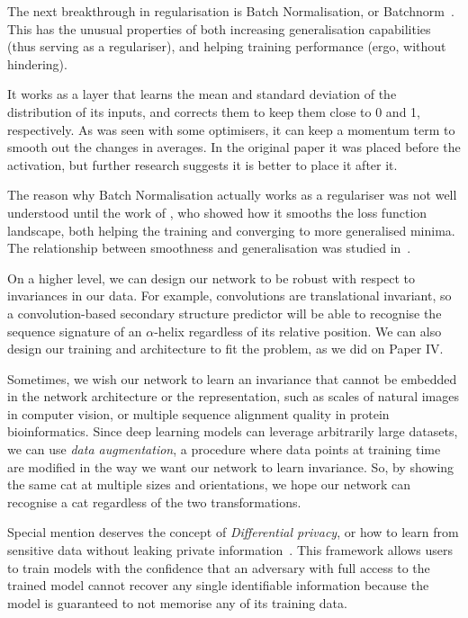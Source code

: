 The next breakthrough in regularisation is Batch Normalisation, 
or Batchnorm~\citep{bn}.
This has the unusual properties of both increasing generalisation capabilities (thus serving as a regulariser), and helping training performance (ergo, without hindering).

It works as a layer that learns the mean and standard deviation of the distribution of its inputs, and corrects them to keep them close to 0 and 1, respectively.
As was seen with some optimisers, it can keep a momentum term to smooth out the changes in averages.
In the original paper it was placed before the activation, but further research suggests it is better to place it after it.

The reason why Batch Normalisation actually works as a regulariser was not well understood until the work of \citet{how_bn_works}, who showed how it smooths the loss function landscape, both helping the training and converging to more generalised minima.
The relationship between smoothness and generalisation was studied in~\citep{large_batch}.

On a higher level,
we can design our network to be robust with respect to invariances in our data.
For example, convolutions are translational invariant, so a convolution-based secondary structure predictor will be able to recognise the sequence signature of an $\alpha$-helix regardless of its relative position.
We can also  design our training and architecture to fit the problem, as we did on Paper IV.

Sometimes,  we wish our network to learn an invariance that cannot be embedded in the network architecture or the representation, such as scales of natural images in computer vision, or multiple sequence alignment quality in protein bioinformatics.
Since deep learning models can leverage arbitrarily large datasets, we can use \emph{data augmentation}, a procedure where data points at training time are modified in the way we want our network to learn invariance.
So, by showing the same cat at multiple sizes and orientations, we hope our network can recognise a cat regardless of the two transformations.

Special mention deserves the concept of \emph{Differential privacy}, 
or how to learn from sensitive data without leaking private information~\citep{differential_privacy}.
This framework allows users to train models with the confidence that an adversary with full access to the trained model cannot recover any single identifiable information because the model is guaranteed to not memorise any of its training data.

